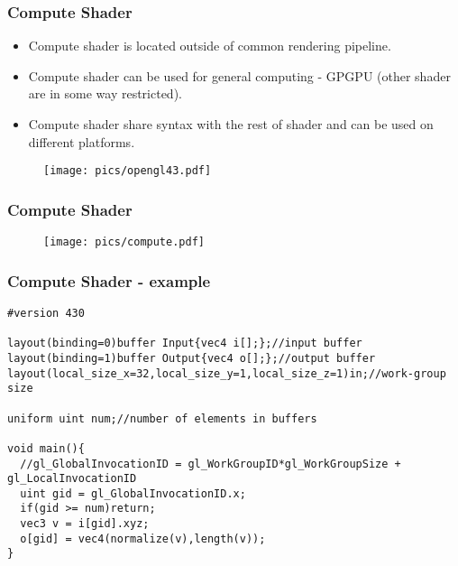 
\begin{frame}
\frametitle{Compute Shader}
	\begin{itemize}
	\item Compute shader is located outside of common rendering pipeline.
  \item Compute shader can be used for general computing - GPGPU (other shader are in some way restricted).
  \item Compute shader share syntax with the rest of shader and can be used on different platforms.
	\end{itemize}
	\begin{figure}[h]
	\texttt{[image: pics/opengl43.pdf]}
	\end{figure}
\end{frame}

\begin{frame}
\frametitle{Compute Shader}
	\begin{figure}[h]
	\texttt{[image: pics/compute.pdf]}
	\end{figure}
\end{frame}

\begin{frame}[fragile]
\frametitle{Compute Shader - example}
{\scriptsize
\begin{verbatim}
#version 430

layout(binding=0)buffer Input{vec4 i[];};//input buffer
layout(binding=1)buffer Output{vec4 o[];};//output buffer
layout(local_size_x=32,local_size_y=1,local_size_z=1)in;//work-group size

uniform uint num;//number of elements in buffers

void main(){
  //gl_GlobalInvocationID = gl_WorkGroupID*gl_WorkGroupSize + gl_LocalInvocationID	
  uint gid = gl_GlobalInvocationID.x;
  if(gid >= num)return;
  vec3 v = i[gid].xyz;
  o[gid] = vec4(normalize(v),length(v));
}
\end{verbatim}
}
\end{frame}

